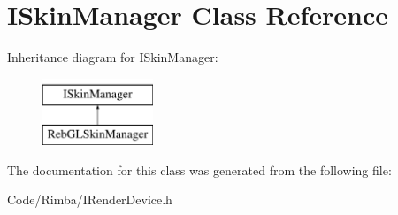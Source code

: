\hypertarget{class_i_skin_manager}{}\section{I\+Skin\+Manager Class Reference}
\label{class_i_skin_manager}
Inheritance diagram for I\+Skin\+Manager\+:\begin{figure}[H]
\begin{center}
\leavevmode
\includegraphics[height=2.000000cm]{class_i_skin_manager}
\end{center}
\end{figure}


The documentation for this class was generated from the following file\+:\begin{DoxyCompactItemize}
\item 
Code/\+Rimba/I\+Render\+Device.\+h\end{DoxyCompactItemize}
